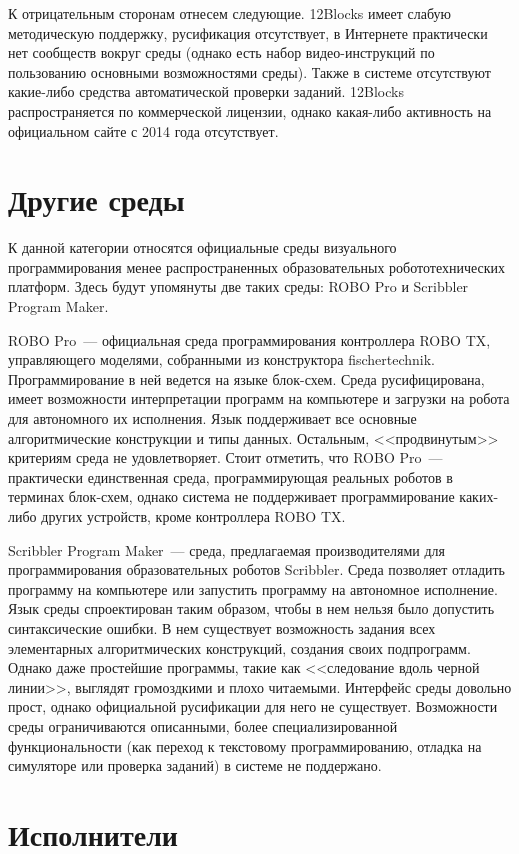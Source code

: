\documentclass[a5paper]{article}
\begin{document}
К отрицательным сторонам отнесем следующие.  12Blocks имеет слабую методическую поддержку, русификация 
отсутствует, в Интернете практически нет сообществ вокруг среды (однако есть набор видео-инструкций по пользованию 
основными возможностями среды). Также в системе отсутствуют какие-либо средства автоматической проверки заданий. 
12Blocks распространяется по коммерческой лицензии, однако какая-либо активность на официальном сайте 
с 2014 года отсутствует.

\section{Другие среды}

К данной категории относятся официальные среды визуального программирования менее распространенных образовательных 
робототехнических платформ. Здесь будут упомянуты две таких среды: ROBO Pro и Scribbler Program Maker.

ROBO Pro~--- официальная среда программирования контроллера ROBO TX, управляющего моделями, собранными из 
конструктора fischertechnik. Программирование в ней ведется на языке блок-схем. Среда русифицирована, имеет 
возможности интерпретации программ на компьютере и загрузки на робота для автономного их исполнения. Язык поддерживает 
все основные алгоритмические конструкции и типы данных. Остальным, <<продвинутым>> критериям среда не удовлетворяет. 
Стоит отметить, что ROBO Pro~--- практически единственная среда, программирующая реальных роботов в терминах 
блок-схем, однако система не поддерживает программирование каких-либо других устройств, кроме контроллера ROBO TX.

Scribbler Program Maker~--- среда, предлагаемая производителями для программирования образовательных роботов 
Scribbler. Среда позволяет отладить программу на компьютере или запустить программу на автономное исполнение. 
Язык среды спроектирован таким образом, чтобы в нем нельзя было допустить синтаксические ошибки. В нем существует 
возможность задания всех элементарных алгоритмических конструкций, создания своих подпрограмм. Однако даже простейшие 
программы, такие как <<следование вдоль черной линии>>, выглядят громоздкими и плохо читаемыми. Интерфейс среды 
довольно прост, однако официальной русификации для него не существует. Возможности среды ограничиваются 
описанными, более специализированной функциональности (как переход к текстовому программированию, отладка на 
симуляторе или проверка заданий) в системе не поддержано.

\section{Исполнители}
\end{document}
